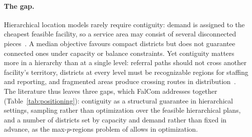 \documentclass[11pt]{article}
\theoremstyle{definition}
\begin{document}
\paragraph{The gap.}
\label{sec:gaps}
Hierarchical location models rarely require contiguity: demand is assigned to the cheapest feasible facility, so a service area may consist of several disconnected pieces~\citep{contreras2020hierarchical}. A median objective favours compact districts but does not guarantee connected ones under capacity or balance constraints. Yet contiguity matters more in a hierarchy than at a single level: referral paths should not cross another facility's territory, districts at every level must be recognizable regions for staffing and reporting, and fragmented areas produce crossing routes in distribution~\citep{MUYLDERMANS2002521}. The literature thus leaves three gaps, which FalCom addresses together (Table~\ref{tab:positioning}): contiguity as a structural guarantee in hierarchical settings, sampling rather than optimization over the feasible hierarchical plans, and a number of districts set by capacity and demand rather than fixed in advance, as the max-$p$-regions problem of \citet{duque2012maxp} allows in optimization.

\end{document}

